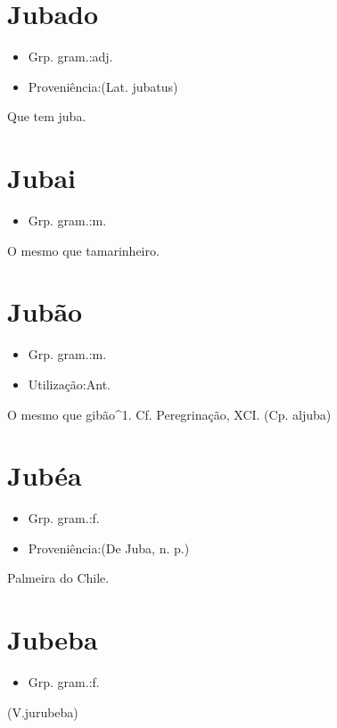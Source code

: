 \documentclass{article}
\begin{document}
\section{Jubado}
\begin{itemize}
\item {Grp. gram.:adj.}
\end{itemize}
\begin{itemize}
\item {Proveniência:(Lat. \textunderscore jubatus\textunderscore )}
\end{itemize}
Que tem juba.
\section{Jubai}
\begin{itemize}
\item {Grp. gram.:m.}
\end{itemize}
O mesmo que \textunderscore tamarinheiro\textunderscore .
\section{Jubão}
\begin{itemize}
\item {Grp. gram.:m.}
\end{itemize}
\begin{itemize}
\item {Utilização:Ant.}
\end{itemize}
O mesmo que \textunderscore gibão\textunderscore ^1. Cf. \textunderscore Peregrinação\textunderscore , XCI.
(Cp. \textunderscore aljuba\textunderscore )
\section{Jubéa}
\begin{itemize}
\item {Grp. gram.:f.}
\end{itemize}
\begin{itemize}
\item {Proveniência:(De \textunderscore Juba\textunderscore , n. p.)}
\end{itemize}
Palmeira do Chile.
\section{Jubeba}
\begin{itemize}
\item {Grp. gram.:f.}
\end{itemize}
(V.jurubeba)
\end{document}
